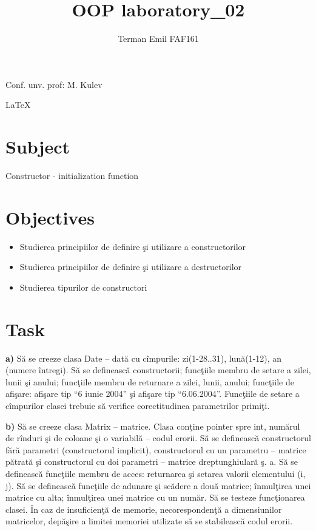 \documentclass{article}
\begin{document}
	\newcommand{\cppInLine}[1]{
		{\lstinline[basicstyle=\small]|#1|}
	}

	\title{OOP laboratory\_02}
	\author{Terman Emil FAF161}
	\maketitle

	\vspace*{\fill}
	
	\begin{flushright}
		Conf. unv. prof: M. Kulev
	\end{flushright}

	\begin{center}
		\LaTeX
	\end{center}

	\pagebreak

	\section{Subject}
		Constructor - initialization function
	\section{Objectives}
		\begin{itemize}
			\item Studierea principiilor de definire şi utilizare a constructorilor

			\item Studierea principiilor de def­­­inire şi utilizare a destructorilor
			
			\item Studierea tipurilor de constructori
		\end{itemize}

	\section{Task}
		\textbf{a)} Să se creeze clasa Date – dată cu cîmpurile: zi(1-28..31), lună(1-12), an (numere întregi). Să se definească constructorii; funcţiile membru de setare a zilei, lunii şi anului; funcţiile membru de returnare a zilei, lunii, anului; funcţiile de afişare: afişare tip \enquote{6 iunie 2004} şi afişare tip \enquote{6.06.2004}. Funcţiile de setare a cîmpurilor clasei trebuie să verifice corectitudinea parametrilor primiţi.

		\textbf{b)} Să se creeze clasa Matrix – matrice. Clasa conţine pointer spre int, numărul de rînduri şi de coloane şi o variabilă – codul erorii. Să se definească constructorul fără parametri (constructorul implicit), constructorul cu un parametru – matrice pătrată şi constructorul cu doi parametri – matrice dreptunghiulară ş. a. Să se definească funcţiile membru de acces: returnarea şi setarea valorii elementului (i, j). Să se definească funcţiile de adunare şi scădere a două matrice; înmulţirea unei matrice cu alta; înmulţirea unei matrice cu un număr. Să se testeze funcţionarea clasei. În caz de insuficienţă de memorie, necorespondenţă a dimensiunilor matricelor, depăşire a limitei memoriei utilizate să se stabilească codul erorii. 
\end{document}
